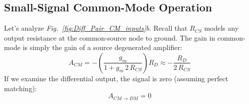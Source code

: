 \subsection{Small-Signal Common-Mode Operation}
Let's analyze \emph{Fig.~\ref{fig:Diff_Pair_CM_inputs}b}.  Recall that $R_{CS}$ models any output resistance at the common-source node to ground.  The gain in common-mode is simply the gain of a source degenerated amplifier:
    \begin{equation}
        A_{CM} = -\left(\frac{g_m}{1 + g_m\,2\,R_{CS}}\right)R_D \approx -\frac{R_D}{2\,R_{CS}}
    \end{equation}
If we examine the differential output, the signal is zero (assuming perfect matching):
    \begin{equation}
        A_{CM \to DM} = 0
    \end{equation}
